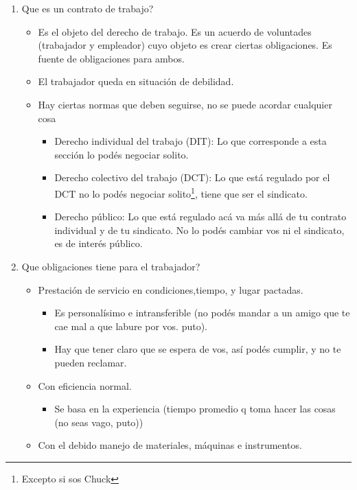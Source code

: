 \documentclass[spanish,12pt,a4paper,titlepage]{report}
\begin{document}
\begin{enumerate}
\item Que es un contrato de trabajo?
  \begin{itemize}
  \item Es el objeto del derecho de trabajo. Es un acuerdo de voluntades (trabajador y empleador) cuyo objeto es crear ciertas obligaciones. Es fuente de obligaciones para ambos.
  \item El trabajador queda en situación de debilidad.
  \item Hay ciertas normas que deben seguirse, no se puede acordar cualquier cosa
    \begin{itemize}
    \item Derecho individual del trabajo (DIT): Lo que corresponde a esta sección lo podés negociar solito.
    \item Derecho colectivo del trabajo (DCT): Lo que está regulado por el DCT no lo podés negociar solito\footnote{Excepto si sos Chuck}, tiene que ser el sindicato.
    \item Derecho público: Lo que está regulado acá va más allá de tu contrato individual y de tu sindicato. No lo podés cambiar vos ni el sindicato, es de interés público.
    \end{itemize}
  \end{itemize}
\item Que obligaciones tiene para el trabajador?
  \begin{itemize}
  \item Prestación de servicio en condiciones,tiempo, y lugar pactadas.
    \begin{itemize}
    \item Es personalísimo e intransferible (no podés mandar a un amigo que te cae mal a que labure por vos. puto).
    \item Hay que tener claro que se espera de vos, así podés cumplir, y no te pueden reclamar.
    \end{itemize}
  \item Con eficiencia normal.
    \begin{itemize}
    \item Se basa en la experiencia (tiempo promedio q toma hacer las cosas (no seas vago, puto))
    \end{itemize}
  \item Con el debido manejo de materiales, máquinas e instrumentos.

\end{itemize}
\end{enumerate}
\end{document}
